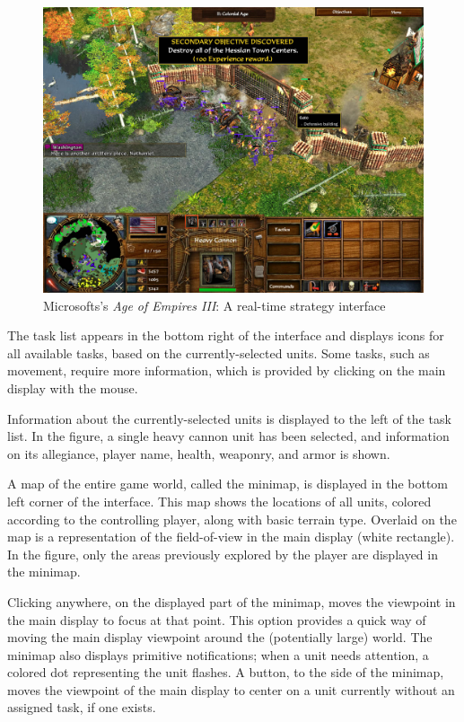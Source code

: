 \begin{figure}[ht]
\begin{center}
\includegraphics[width=5in]{images/age_of_empires_3.jpg}
\caption{Microsofts's \emph{Age of Empires III}: A real-time strategy interface \label{fig:aoe3}}
\end{center}
\end{figure}


The task list appears in the bottom right of the interface and displays icons for all available tasks, based on the currently-selected units. Some tasks, such as movement, require more information, which is provided by clicking on the main display with the mouse.

Information about the currently-selected units is displayed to the left of the task list. In the figure, a single heavy cannon unit has been selected, and information on its allegiance, player name, health, weaponry, and armor is shown.

A map of the entire game world, called the minimap, is displayed in the bottom left corner of the interface. This map shows the locations of all units, colored according to the controlling player, along with basic terrain type. Overlaid on the map is a representation of the field-of-view in the main display (white rectangle). In the figure, only the areas previously explored by the player are displayed in the minimap. %

Clicking anywhere, on the displayed part of the minimap, moves the viewpoint in the main display to focus at that point. This option provides a quick way of moving the main display viewpoint around the (potentially large) world. The minimap also displays primitive notifications; when a unit needs attention, a colored dot representing the unit flashes. A button, to the side of the minimap, moves the viewpoint of the main display to center on a unit currently without an assigned task, if one exists.

